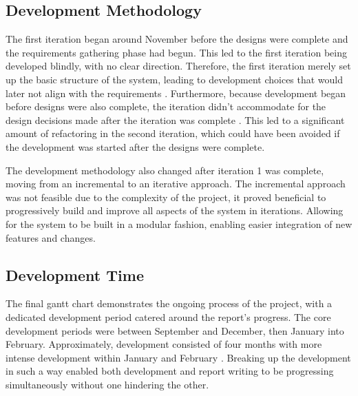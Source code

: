 \subsection{Development Methodology}
The first iteration began around November before the designs were complete and the requirements gathering phase had begun. This led to the first iteration being developed blindly, with no clear direction. Therefore, the first iteration merely set up the basic structure of the system, leading to development choices that would later not align with the requirements . Furthermore, because development began before designs were also complete, the iteration didn't accommodate for the design decisions made after the iteration was complete . This led to a significant amount of refactoring in the second iteration, which could have been avoided if the development was started after the designs were complete.

The development methodology also changed after iteration 1 was complete, moving from an incremental to an iterative approach. The incremental approach was not feasible due to the complexity of the project, it proved beneficial to progressively build and improve all aspects of the system in iterations. Allowing for the system to be built in a modular fashion, enabling easier integration of new features and changes.

\subsection{Development Time}
The final gantt chart  demonstrates the ongoing process of the project, with a dedicated development period catered around the report's progress. The core development periods were between September and December, then January into February. Approximately, development consisted of four months with more intense development within January and February . Breaking up the development in such a way enabled both development and report writing to be progressing simultaneously without one hindering the other.

